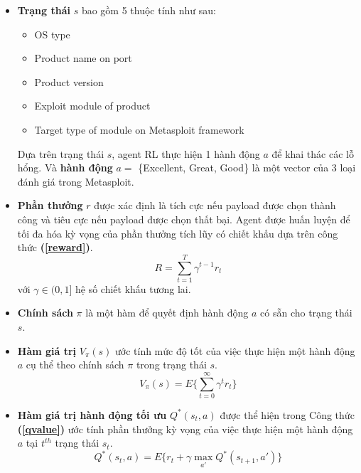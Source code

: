 \begin{itemize}
    \item \textbf{Trạng thái} $s$ bao gồm 5 thuộc tính như sau:
    
        \begin{itemize}
            \item OS type
            \item Product name on port
            \item Product version
            \item Exploit module of product
            \item Target type of module on Metasploit framework
        \end{itemize}

    Dựa trên trạng thái $s$, agent RL thực hiện 1 hành động $a$ để khai thác các lỗ hổng. Và \textbf{hành động} $a =$ \{Excellent, Great, Good\}  là một vector của 3 loại đánh giá trong Metasploit.
    \item \textbf{Phần thưởng} $r$ được xác định là tích cực nếu payload được chọn thành công và tiêu cực nếu payload được chọn thất bại. Agent được huấn luyện để tối đa hóa kỳ vọng của phần thưởng tích lũy có chiết khấu dựa trên công thức \textbf{(\ref{reward})}.
    \begin{equation}
        R = \sum^{T}_{t=1} \gamma^{t-1} r_t  
        \label{reward}
    \end{equation}
    với $\gamma \in (0, 1]$  hệ số chiết khấu tương lai.
    \item \textbf{Chính sách} $\pi$ là một hàm để quyết định hành động $a$ có sẵn cho trạng thái $s$.
    \item \textbf{Hàm giá trị} $V_{\pi}(s)$ ước tính mức độ tốt của việc thực hiện một hành động $a$ cụ thể theo chính sách $\pi$ trong trạng thái $s$.
    \begin{equation}
        V_{\pi}(s) = E\{\sum^{\infty}_{t=0} \gamma^{t} r_t  \}
        \label{vvalue}
    \end{equation}
    \item \textbf{Hàm giá trị hành động tối ưu} $Q^*(s_t, a)$ được thể hiện trong Công thức \textbf{(\ref{qvalue})} ước tính phần thưởng kỳ vọng của việc thực hiện một hành động $a$ tại $t^{th}$ trạng thái $s_t$. 
    \begin{equation}
        Q^*(s_t, a) = E\{r_{t} + \gamma \max_{a'} Q^*(s_{t+1},a')\}
        \label{qvalue}
    \end{equation}
\end{itemize}

